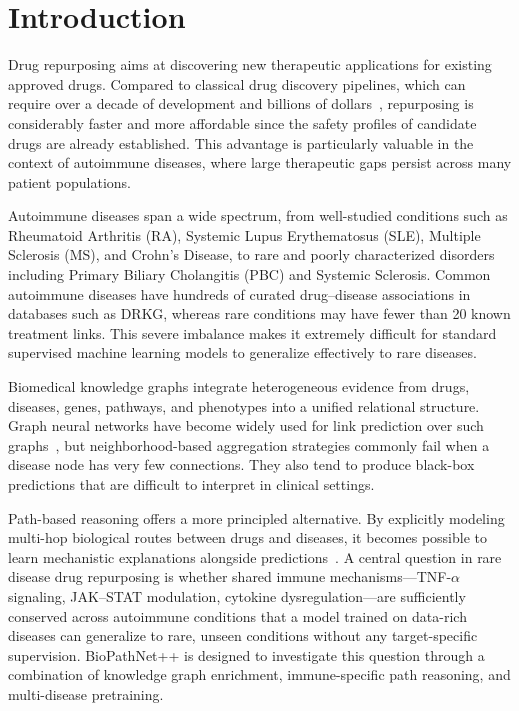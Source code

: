 \documentclass[conference]{IEEEtran}
\begin{document}
\section{Introduction}

Drug repurposing aims at discovering new therapeutic applications for existing approved drugs. Compared to classical drug discovery pipelines, which can require over a decade of development and billions of dollars~\cite{drkg}, repurposing is considerably faster and more affordable since the safety profiles of candidate drugs are already established. This advantage is particularly valuable in the context of autoimmune diseases, where large therapeutic gaps persist across many patient populations.

Autoimmune diseases span a wide spectrum, from well-studied conditions such as Rheumatoid Arthritis (RA), Systemic Lupus Erythematosus (SLE), Multiple Sclerosis (MS), and Crohn's Disease, to rare and poorly characterized disorders including Primary Biliary Cholangitis (PBC) and Systemic Sclerosis. Common autoimmune diseases have hundreds of curated drug--disease associations in databases such as DRKG, whereas rare conditions may have fewer than 20 known treatment links. This severe imbalance makes it extremely difficult for standard supervised machine learning models to generalize effectively to rare diseases.

Biomedical knowledge graphs integrate heterogeneous evidence from drugs, diseases, genes, pathways, and phenotypes into a unified relational structure. Graph neural networks have become widely used for link prediction over such graphs~\cite{distmult}, but neighborhood-based aggregation strategies commonly fail when a disease node has very few connections. They also tend to produce black-box predictions that are difficult to interpret in clinical settings.

Path-based reasoning offers a more principled alternative. By explicitly modeling multi-hop biological routes between drugs and diseases, it becomes possible to learn mechanistic explanations alongside predictions~\cite{nbfnet}. A central question in rare disease drug repurposing is whether shared immune mechanisms---TNF-$\alpha$ signaling, JAK--STAT modulation, cytokine dysregulation---are sufficiently conserved across autoimmune conditions that a model trained on data-rich diseases can generalize to rare, unseen conditions without any target-specific supervision. BioPathNet++ is designed to investigate this question through a combination of knowledge graph enrichment, immune-specific path reasoning, and multi-disease pretraining.
\end{document}
